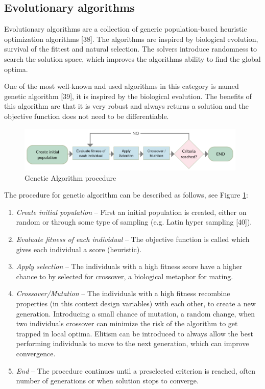 \subsection{Evolutionary algorithms}
Evolutionary algorithms are a collection of generic population-based heuristic optimization algorithms [38]. The algorithms are inspired by biological evolution, survival of the fittest and natural selection. The solvers introduce randomness to search the solution space, which improves the algorithms ability to find the global optima.

One of the most well-known and used algorithms in this category is named genetic algorithm [39], it is inspired by the biological evolution. The benefits of this algorithm are that it is very robust and always returns a solution and the objective function does not need to be differentiable. 

\begin{figure}
  \includegraphics[width=310pt]{graphics/ga.png}
  \caption{Genetic Algorithm procedure}
  \label{fig:ga}
\end{figure}


The procedure for genetic algorithm can be described as follows, see Figure \ref{fig:ga}:

\begin{enumerate} 
\item \textit{Create initial population }– First an initial population is created, either on random or through some type of sampling (e.g. Latin hyper sampling [40]).
\item \textit{Evaluate fitness of each individual} – The objective function is called which gives each individual a score (heuristic).
\item \textit{Apply selection} – The individuals with a high fitness score have a higher chance to by selected for crossover, a biological metaphor for mating.
\item \textit{Crossover/Mutation} – The individuals with a high fitness recombine properties (in this context design variables) with each other, to create a new generation. Introducing a small chance of mutation, a random change, when two individuals crossover can minimize the risk of the algorithm to get trapped in local optima. Elitism can be introduced to always allow the best performing individuals to move to the next generation, which can improve convergence. 
\item \textit{End} – The procedure continues until a preselected criterion is reached, often number of generations or when solution stops to converge.
\end{enumerate} 


